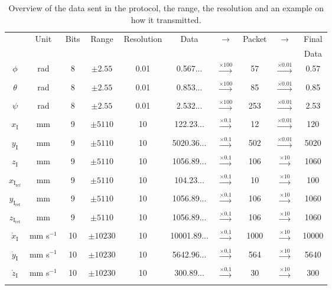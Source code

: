 \begin{table}[H]
    \centering
    \begin{tabular}{|c|c|c|c|c|ccccc|}
        \hline
        \multirow{2}{*}{}      &  \multirow{2}{*}{Unit}       &  \multirow{2}{*}{Bits}     & \multirow{2}{*}{Range} 	   & \multirow{2}{*}{Resolution} 	  & \multirow{2}{*}{Data}& \multirow{2}{*}{$\rightarrow$}& \multirow{2}{*}{Packet}& \multirow{2}{*}{$\rightarrow$}& Final\\
          & & & & & & & & & Data	 \\ \hline
        $\phi$         & rad	 &	8    & $\pm 2.55$ & 0.01 & 0.567... &$\xrightarrow[]{\times 100}$& 57&$\xrightarrow[]{\times 0.01}$&0.57\\ \hline
        $\theta$       & rad	&	8    & $\pm 2.55$ & 0.01 & 0.853... &$\xrightarrow[]{\times 100}$& 85&$\xrightarrow[]{\times 0.01}$&0.85\\ \hline
        $\psi$         & rad	&	8    & $\pm 2.55$ & 0.01 & 2.532... &$\xrightarrow[]{\times 100}$& 253&$\xrightarrow[]{\times 0.01}$&2.53\\ \hline
        $x_{\mathrm{I}}$         & mm	&  9  & $\pm 5110$ & 10  & 122.23...& $\xrightarrow[]{\times 0.1}$& 12&$\xrightarrow[]{\times 0.01}$&120\\ \hline
        $y_{\mathrm{I}}$         & mm	&9	    & $\pm 5110$ & 10 & 5020.36...& $\xrightarrow[]{\times 0.1}$& 502&$\xrightarrow[]{\times 0.01}$&5020\\ \hline
        $z_{\mathrm{I}}$         & mm	&   9     & $\pm 5110$ & 10 & 1056.89...&$\xrightarrow[]{\times 0.1}$& 106&$\xrightarrow[]{\times 10}$&1060\\ \hline
        $x_{\mathrm{I_{ref}}}$     & mm	&9	    & $\pm 5110$ & 10 & 104.23... &$\xrightarrow[]{\times 0.1}$& 10&$\xrightarrow[]{\times 10}$&100\\ \hline
        $y_{\mathrm{I_{ref}}}$     & mm	& 9   & $\pm 5110$ & 10 &  1056.89... &$\xrightarrow[]{\times 0.1}$& 106&$\xrightarrow[]{\times 10}$&1060\\ \hline
        $z_{\mathrm{I_{ref}}}$     & mm 	&9	    & $\pm 5110$ & 10 & 1056.89... &$\xrightarrow[]{\times 0.1}$& 106&$\xrightarrow[]{\times 10}$&1060\\ \hline
        $\dot{x}_{\mathrm{I}}$  & mm s$^{-1}$		 &  10 & $\pm 10230$ & 10 & 10001.89...& $\xrightarrow[]{\times 0.1}$& 1000&$\xrightarrow[]{\times 10}$&10000\\ \hline
        $\dot{y}_{\mathrm{I}}$  & 	mm s$^{-1}$	&  10  & $\pm 10230$ & 10 & 5642.96... &$\xrightarrow[]{\times 0.1}$& 564&$\xrightarrow[]{\times 10}$&5640\\ \hline
        $\dot{z}_{\mathrm{I}}$  & 	mm s$^{-1}$	&  10  & $\pm 10230$ & 10 & 300.89... &$\xrightarrow[]{\times 0.1}$& 30&$\xrightarrow[]{\times 10}$&300\\ \hline        
    \end{tabular}
    \caption{Overview of the data sent in the protocol, the range, the resolution and an example on how it transmitted.}
    \label{tab:data}
\end{table}


